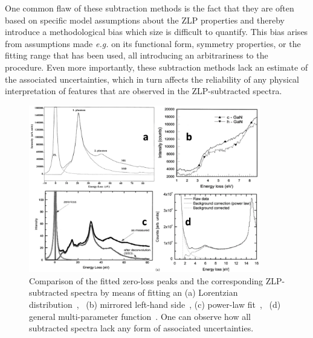 One common flaw of these subtraction methods is the fact that they are often based on specific
model assumptions about the ZLP properties and thereby introduce a methodological
bias which size is difficult to quantify. 
%
This bias arises from assumptions made {\it e.g.} on its functional form, symmetry 
properties, or the fitting range that has been used, all introducing an arbitrariness
to the procedure.
%
Even more importantly, these subtraction methods lack an estimate of the associated uncertainties, 
which in turn affects the reliability of any physical interpretation of features that are observed
in the ZLP-subtracted spectra.

\begin{figure}[t]
    \centering
    \includegraphics[width=0.9\textwidth]{plots/compare_subtractions.pdf}
    \caption{Comparison of the fitted zero-loss peaks and the corresponding ZLP-subtracted 
    spectra by means of fitting an (a) Lorentzian distribution~\cite{Dorneich:1998}, \
    (b) mirrored left-hand side~\cite{Lazar:2003}, (c) power-law fit~\cite{Erni:2005}, \
    (d) general multi-parameter function~\cite{Benthem:2001}.
    One can observe how all subtracted spectra lack any form of associated uncertainties.}
    \label{fig:comparesub}
\end{figure}




